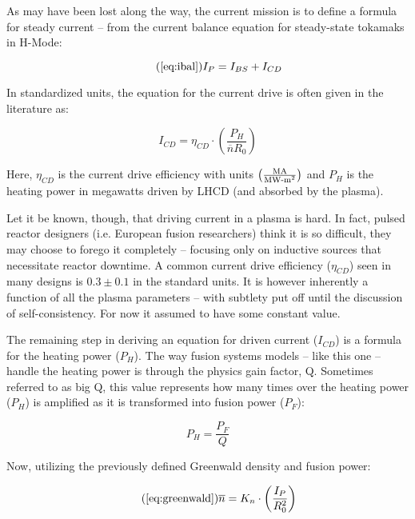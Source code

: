 As may have been lost along the way, the current mission is to define a formula for steady current -- from the current balance equation for steady-state tokamaks in H-Mode:

\begin{equation}
		\tag{\ref{eq:ibal}}
		I_P = I_{BS} + I_{CD}
\end{equation}

In standardized units, the equation for the current drive is often given in the literature as: \cite{itercd}

\begin{equation}
	I_{CD} = \eta_{CD} \cdot \left( \frac{P_H}{\overline n R_0} \right)
\end{equation}

Here, $\eta_{CD}$ is the current drive efficiency with units $ \left(
\frac{ \textnormal{MA} }{ \textnormal{MW-m}^2 } \right) $ and $P_H$ is the heating power in megawatts driven by LHCD (and absorbed by the plasma).

Let it be known, though, that driving current in a plasma is hard. In fact, pulsed reactor designers (i.e. European fusion researchers) think it is so difficult, they may choose to forego it completely -- focusing only on inductive sources that necessitate reactor downtime. A common current drive efficiency ($\eta_{CD}$) seen in many designs is $0.3 \pm 0.1 $ in the standard units. It is however inherently a function of all the plasma parameters -- with subtlety put off until the discussion of self-consistency. For now it assumed to have some constant value.

The remaining step in deriving an equation for driven current ($I_{CD}$) is a formula for the heating power ($P_H$). The way fusion systems models -- like this one -- handle the heating power is through the physics gain factor, Q. Sometimes referred to as big Q, this value represents how many times over the heating power ($P_H$) is amplified as it is transformed into fusion power ($P_F$):

\begin{equation}
	P_H = \frac{P_F}{Q}
\end{equation}

Now, utilizing the previously defined Greenwald density and fusion power:

 \begin{equation}
 	\tag{\ref{eq:greenwald}}
 	\overline n = K_n \cdot \left( \frac{I_P}{R_0^2} \right)
 \end{equation}
 

